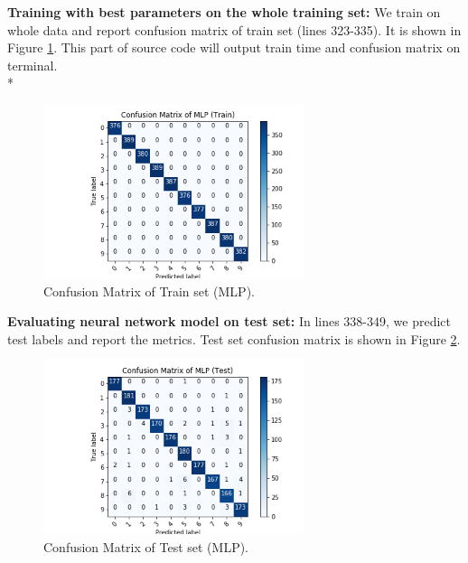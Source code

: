 \documentclass[12pt]{article}
\begin{document}
\textbf{Training with best parameters on the whole training set:} We train on whole data and report confusion matrix of train set (lines 323-335). It is shown in Figure \ref{fig:mlptrain}. This part of source code will output train time and confusion matrix on terminal.\\*
\begin{figure}[h] 
	\begin{center}
		\includegraphics[width=3in]{mlptrain.png}
		\caption{Confusion Matrix of Train set (MLP).}
		\label{fig:mlptrain}
	\end{center}
\end{figure} 
\textbf{Evaluating neural network model on test set:} In lines 338-349, we predict test labels and report the metrics. Test set confusion matrix is shown in Figure \ref{fig:mlptest}.
\begin{figure}[ht] 
	\begin{center}
		\includegraphics[width=3in]{mlptest.png}
		\caption{Confusion Matrix of Test set (MLP).}
		\label{fig:mlptest}
	\end{center}
\end{figure} 
\end{document}

